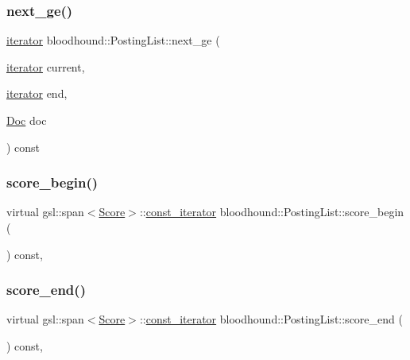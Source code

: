 \subsubsection{\texorpdfstring{next\+\_\+ge()}{next\_ge()}\hspace{0.1cm}{\footnotesize\ttfamily [2/2]}}
{\footnotesize\ttfamily \mbox{\hyperlink{structbloodhound_1_1PostingList_1_1iterator}{iterator}} bloodhound\+::\+Posting\+List\+::next\+\_\+ge (\begin{DoxyParamCaption}\item[{\mbox{\hyperlink{structbloodhound_1_1PostingList_1_1iterator}{iterator}}}]{current,  }\item[{\mbox{\hyperlink{structbloodhound_1_1PostingList_1_1iterator}{iterator}}}]{end,  }\item[{\mbox{\hyperlink{structbloodhound_1_1Doc}{Doc}}}]{doc }\end{DoxyParamCaption}) const\hspace{0.3cm}{\ttfamily [inline]}}

\mbox{\label{classbloodhound_1_1PostingList_aec5d5bb81622fb64d7b64416a8491456}} 
\subsubsection{\texorpdfstring{score\+\_\+begin()}{score\_begin()}}
{\footnotesize\ttfamily virtual gsl\+::span$<$\mbox{\hyperlink{structbloodhound_1_1Score}{Score}}$>$\+::\mbox{\hyperlink{structbloodhound_1_1PostingList_1_1const__iterator}{const\+\_\+iterator}} bloodhound\+::\+Posting\+List\+::score\+\_\+begin (\begin{DoxyParamCaption}{ }\end{DoxyParamCaption}) const\hspace{0.3cm}{\ttfamily [inline]}, {\ttfamily [virtual]}}

\mbox{\label{classbloodhound_1_1PostingList_ae89abf9882f73f35a6e106c5a328ca6f}} 
\subsubsection{\texorpdfstring{score\+\_\+end()}{score\_end()}}
{\footnotesize\ttfamily virtual gsl\+::span$<$\mbox{\hyperlink{structbloodhound_1_1Score}{Score}}$>$\+::\mbox{\hyperlink{structbloodhound_1_1PostingList_1_1const__iterator}{const\+\_\+iterator}} bloodhound\+::\+Posting\+List\+::score\+\_\+end (\begin{DoxyParamCaption}{ }\end{DoxyParamCaption}) const\hspace{0.3cm}{\ttfamily [inline]}, {\ttfamily [virtual]}}

